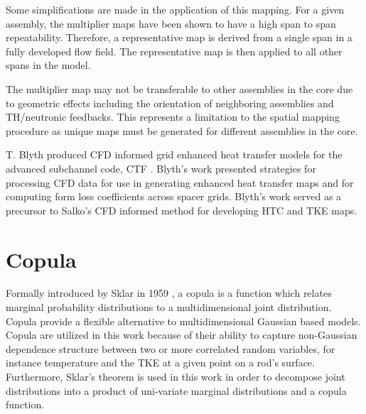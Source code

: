 Some simplifications are made in the application of this mapping.  For a given assembly, the multiplier maps have been shown to have a high span to span repeatability.  Therefore, a representative map is derived from a single span in a fully developed flow field.  The representative map is then applied to all other spans in the model.

The multiplier map may not be transferable to other assemblies in the core due to geometric effects including the orientation of neighboring assemblies and TH/neutronic feedbacks.  This represents a limitation to the spatial mapping procedure as unique maps must be generated for different assemblies in the core.

T. Blyth produced CFD informed grid enhanced heat transfer models for the advanced subchannel code, CTF \cite{blyth2014} \cite{blyth2017}.  Blyth's work presented strategies for processing CFD data for use in generating enhanced heat transfer maps and for computing form loss coefficients across spacer grids.  Blyth's work served as a precursor to Salko's CFD informed method for developing HTC and TKE maps.


\section{Copula}

Formally introduced by Sklar in 1959 \cite{Sklar1959}, a copula is a function which relates marginal probability distributions to a multidimensional joint distribution.  Copula provide a flexible alternative to multidimensional Gaussian based models.  Copula are utilized in this work because of their ability to capture non-Gaussian dependence structure between two or more correlated random variables, for instance temperature and the TKE at a given point on a rod's surface.  Furthermore, Sklar's theorem is used in this work in order to decompose joint distributions into a product of uni-variate marginal distributions and a copula function.  

